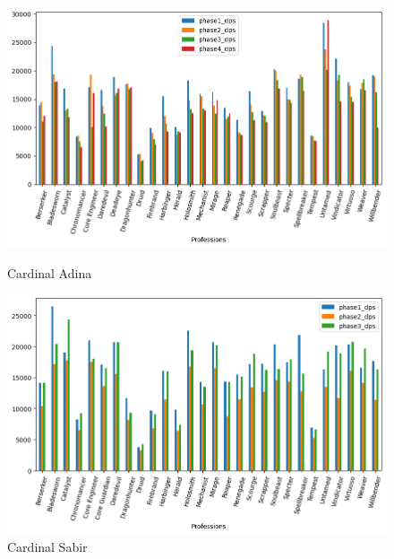 \documentclass[12pt,a4paper]{article}
\begin{document}
    \begin{figure}[h!]
        
        \centering
        
        \includegraphics[width=1 \linewidth]{adina_dps_plot.png}
        \caption{Cardinal Adina}
        \includegraphics[width=1 \linewidth]{sabir_dps_plot.png}
        \caption{Cardinal Sabir}
    \end{figure}

    \newpage
\end{document}

